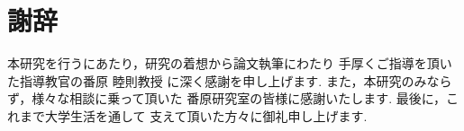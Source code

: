 \chapter*{謝辞}

本研究を行うにあたり，研究の着想から論文執筆にわたり
手厚くご指導を頂いた指導教官の番原 睦則教授
に深く感謝を申し上げます.
また，本研究のみならず，様々な相談に乗って頂いた
番原研究室の皆様に感謝いたします.
最後に，これまで大学生活を通して
支えて頂いた方々に御礼申し上げます.

